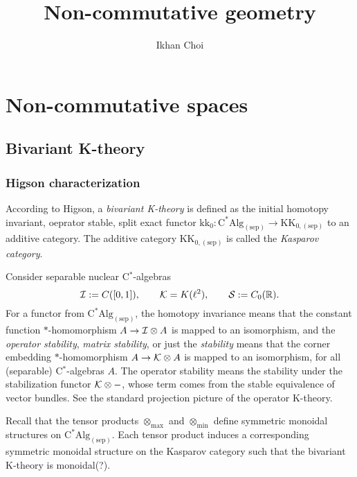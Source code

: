 \documentclass{../../large}
\begin{document}
\title{Non-commutative geometry}
\author{Ikhan Choi}
\maketitle
\tableofcontents



\part{Non-commutative spaces}





\chapter{Bivariant K-theory}



\section{Higson characterization}

\begin{prb}
According to Higson, a \emph{bivariant K-theory} is defined as the initial homotopy invariant, oeprator stable, split exact functor $\mathrm{kk_0}:\mathrm{C^*Alg}_{(\mathrm{sep})}\to\mathrm{KK}_{0,(\mathrm{sep})}$ to an additive category.
The additive category $\mathrm{KK}_{0,(\mathrm{sep})}$ is called the \emph{Kasparov category}.

Consider separable nuclear C$^*$-algebras
\[\mathcal{I}:=C([0,1]),\qquad\mathcal{K}=K(\ell^2),\qquad\mathcal{S}:=C_0(\mathbb{R}).\]
For a functor from $\mathrm{C^*Alg}_{(\mathrm{sep})}$, the homotopy invariance means that the constant function $*$-homomorphism $A\to\mathcal{I}\otimes A$ is mapped to an isomorphism, and the \emph{operator stability}, \emph{matrix stability}, or just the \emph{stability} means that the corner embedding $*$-homomorphism $A\to\mathcal{K}\otimes A$ is mapped to an isomorphism, for all (separable) C$^*$-algebras $A$.
The operator stability means the stability under the stabilization functor $\mathcal{K}\otimes-$, whose term comes from the stable equivalence of vector bundles.
See the standard projection picture of the operator K-theory.

Recall that the tensor products $\otimes_{\max}$ and $\otimes_{\min}$ define symmetric monoidal structures on $\mathrm{C^*Alg}_{(\mathrm{sep})}$.
Each tensor product induces a corresponding symmetric monoidal structure on the Kasparov category such that the bivariant K-theory is monoidal(?).
\end{prb}
\end{document}
